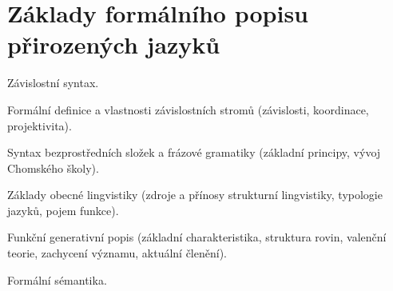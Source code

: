 \newpage
\section{Základy formálního popisu přirozených jazyků}
\begin{pozadavky}
\begin{pitemize}
\item Závislostní syntax.
\item Formální definice a vlastnosti závislostních stromů (závislosti, koordinace, projektivita).
\item Syntax bezprostředních složek a frázové gramatiky (základní principy, vývoj Chomského školy).
\item Základy obecné lingvistiky (zdroje a přínosy strukturní lingvistiky, typologie jazyků, pojem funkce).
\item Funkční generativní popis (základní charakteristika, struktura rovin, valenční teorie, zachycení významu, aktuální členění).
\item Formální sémantika.
\end{pitemize}
\end{pozadavky}